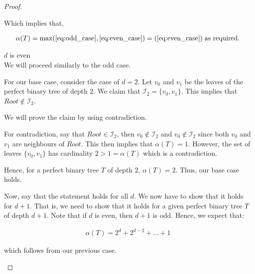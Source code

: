 \documentclass{article}
\theoremstyle{definition}
\begin{document}
\begin{proof}
\begin{caseof}
		Which implies that,

		\begin{align*}
			\alpha(T) = \max(\ref{eq:odd_case}, \ref{eq:even_case}) = (\ref{eq:even_case})\; \text{as required.}
		\end{align*}

		\item $d$ is even \\

		We will proceed similarly to the odd case.

		For our base case, consider the case of $d = 2$. Let $v_0$ and $v_1$ be the leaves of the perfect binary tree of depth $2$. We claim that $\mathcal{I}_2 = \{v_0, v_1\}$. This implies that $Root \not\in \mathcal{I}_2$.

		We will prove the claim by using contradiction.

		For contradiction, say that $Root \in \mathcal{I}_2$, then $v_0 \not\in \mathcal{I}_2$ and $v_0 \not\in \mathcal{I}_2$ since both $v_0$ and $v_1$ are neighbours of $Root$. This then implies that $\alpha(T) = 1$. However, the set of leaves $\{v_0, v_1\}$ has cardinality $2 > 1 = \alpha(T)$ which is a contradiction.

		Hence, for a perfect binary tree $T$ of depth $2$, $\alpha(T) = 2$. Thus, our base case holds.


		Now, say that the statement holds for all $d$. We now have to show that it holds for $d+1$. That is, we need to show that it holds for a given perfect binary tree $T$ of depth $d + 1$. Note that if $d$ is even, then $d + 1$ is odd. Hence, we expect that:

		\begin{align*}
			\alpha(T) = 2^d + 2^{d - 2} + \ldots + 1
		\end{align*}

		which follows from our previous case.
	\end{caseof}
\end{proof}
\end{document}
